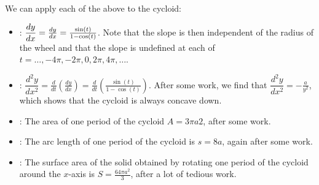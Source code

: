 We can apply each of the above to the cycloid:
\begin{itemize}
    \item {}: \(\dfrac{dy}{dx} = \frac{dy}{dx} = \frac{\sin(t)}{1 - \cos(t)}\). Note that the slope is then independent of the radius of the wheel and
    that the slope is undefined at each of \(t = \dots, -4\pi, -2\pi, 0, 2\pi, 4\pi, \dots\). 
    \item {}: \(\dfrac{d^{2}y}{dx^{2}} = \frac{d}{dt}\left(\frac{dy}{dx}\right) = \frac{d}{dt}\left(\frac{\sin(t)}{1 - \cos(t)}\right)\). After some work, we find that \(\dfrac{d^{2}y}{dx^{2}} = -\frac{a}{y^{2}}\), which shows that the cycloid is always concave down.
    \item {}: The area of one period of the cycloid \(A = 3\pi a2\), after some work. 
    \item {}: The arc length of one period of the cycloid is \(s = 8a\), again after some work.
    \item {}: The surface area of the solid obtained by rotating one period of the cycloid around the \(x\)-axis is \(S = \frac{64\pi a^{2}}{3}\), after a lot of tedious work.
\end{itemize}

